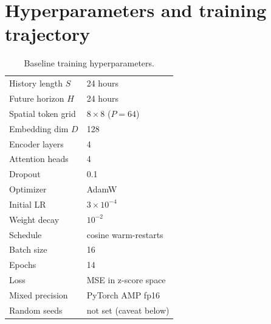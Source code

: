 
\section{Hyperparameters and training trajectory}
\label{app:hparams}

\begin{table}[h]
\centering\small
\caption{Baseline training hyperparameters.}
\label{tab:hparams}
\begin{tabular}{@{}ll@{}}
\toprule
History length $S$            & 24 hours                                    \\
Future horizon $H$            & 24 hours                                    \\
Spatial token grid            & $8\times 8$ ($P=64$)                        \\
Embedding dim $D$             & 128                                         \\
Encoder layers                & 4                                           \\
Attention heads               & 4                                           \\
Dropout                       & 0.1                                         \\
Optimizer                     & AdamW \citep{loshchilov2019adamw}            \\
Initial LR                    & $3\times 10^{-4}$                           \\
Weight decay                  & $10^{-2}$                                   \\
Schedule                      & cosine warm-restarts \citep{loshchilov2017sgdr} \\
Batch size                    & 16                                          \\
Epochs                        & 14                                          \\
Loss                          & MSE in z-score space                        \\
Mixed precision               & PyTorch AMP fp16                            \\
Random seeds                  & not set (caveat below)                      \\
\bottomrule
\end{tabular}
\end{table}

